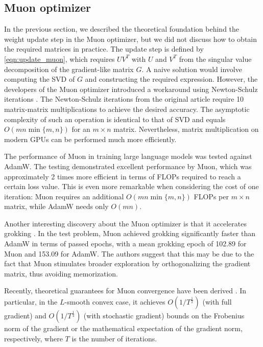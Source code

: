 \documentclass{article} %
\begin{document}
\subsection{Muon optimizer}

In the previous section, we described the theoretical foundation behind the weight update step in the Muon optimizer, but we did not discuss how to obtain the required matrices in practice. The update step is defined by \eqref{eqn:update_muon}, which requires $UV^T$ with $U$ and $V^T$ from the singular value decomposition of the gradient-like matrix $G$. A naive solution would involve computing the SVD of $G$ and constructing the required expression. However, the developers of the Muon optimizer introduced a workaround using Newton-Schulz iterations \cite{jordan2024muon}. The Newton-Schulz iterations from the original article \cite{jordan2024muon} require 10 matrix-matrix multiplications to achieve the desired accuracy. The asymptotic complexity of such an operation is identical to that of SVD and equals $O(mn \min\{m, n\})$ for an $m \times n$ matrix. Nevertheless, matrix multiplication on modern GPUs can be performed much more efficiently.

The performance of Muon in training large language models was tested \cite{liu2025muon} against AdamW. The testing demonstrated excellent performance by Muon, which was approximately 2 times more efficient in terms of FLOPs required to reach a certain loss value. This is even more remarkable when considering the cost of one iteration: Muon requires an additional $O(mn \min\{m, n\})$ FLOPs per $m \times n$ matrix, while AdamW needs only $O(mn)$.

Another interesting discovery about the Muon optimizer is that it accelerates grokking \cite{tveit2025muonoptimizeracceleratesgrokking}. In the test problem, Muon achieved grokking significantly faster than AdamW in terms of passed epochs, with a mean grokking epoch of 102.89 for Muon and 153.09 for AdamW. The authors suggest that this may be due to the fact that Muon stimulates broader exploration by orthogonalizing the gradient matrix, thus avoiding memorization.

Recently, theoretical guarantees for Muon convergence have been derived \cite{li2025noteconvergencemuon}. In particular, in the $L$-smooth convex case, it achieves $O(1/T^{\frac{1}{2}})$ (with full gradient) and $O(1/T^{\frac{1}{4}})$ (with stochastic gradient) bounds on the Frobenius norm of the gradient or the mathematical expectation of the gradient norm, respectively, where $T$ is the number of iterations.
\end{document}
